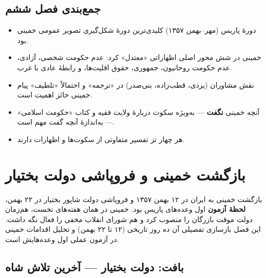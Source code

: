 \documentclass[12pt,a4paper]{book}
\newcommand{\keyword}[1]{\textbf{\textcolor{cPrimary}{#1}}}
\begin{document}
\section{جمع‌بندی فصل ششم}

\begin{principleBox}
\begin{itemize}[label=\textcolor{cPrimary}{$\blacksquare$}, rightmargin=2em]
    \item دورهٔ پاریس (مهر–بهمن ۱۳۵۷) کلیدی‌ترین دورهٔ شکل‌گیری تصویر عمومی خمینی بود.
    \item خمینی در شش محور اصلی اظهاراتی «معتدل» کرد: عدم حکومت شخصی، آزادی، عدم حکومت روحانیون، جمهوری، حقوق اقلیت‌ها، و رابطهٔ عادی با غرب.
    \item نقش مشاوران (یزدی، قطب‌زاده، بنی‌صدر) در «ترجمه» و احتمالاً «تلطیف» پیام خمینی حائز اهمیت است.
    \item آنچه خمینی \keyword{نگفت} — به‌ویژه سکوت دربارهٔ ولایت فقیه و کتاب «حکومت اسلامی» — به‌اندازهٔ آنچه گفت مهم است.
    \item هر چهار تز تفسیر متفاوتی از سکوت‌ها و اظهارات دارند.
\end{itemize}
\end{principleBox}


\chapter{بازگشت خمینی و فروپاشی دولت بختیار}

\begin{infoBox}
بازگشت خمینی به ایران در ۱۲ بهمن ۱۳۵۷ و فروپاشی دولت شاپور بختیار در ۲۲ بهمن، \keyword{لحظهٔ آزمون} اول وعده‌های پاریس بود. خمینی در همان هفته‌های نخست، هم‌زمان دولت موقت بازرگان را منصوب کرد و هم شورای انقلاب مخفی را فعال نگه داشت. این فصل بازسازی تفصیلی آن ده روز تاریخی (۱۲ تا ۲۲ بهمن) و تحلیل اقدامات خمینی در آزمون عملی اول وعده‌هایش است.
\end{infoBox}

\section{بافت: دولت بختیار — آخرین تلاش شاه}
\end{document}
